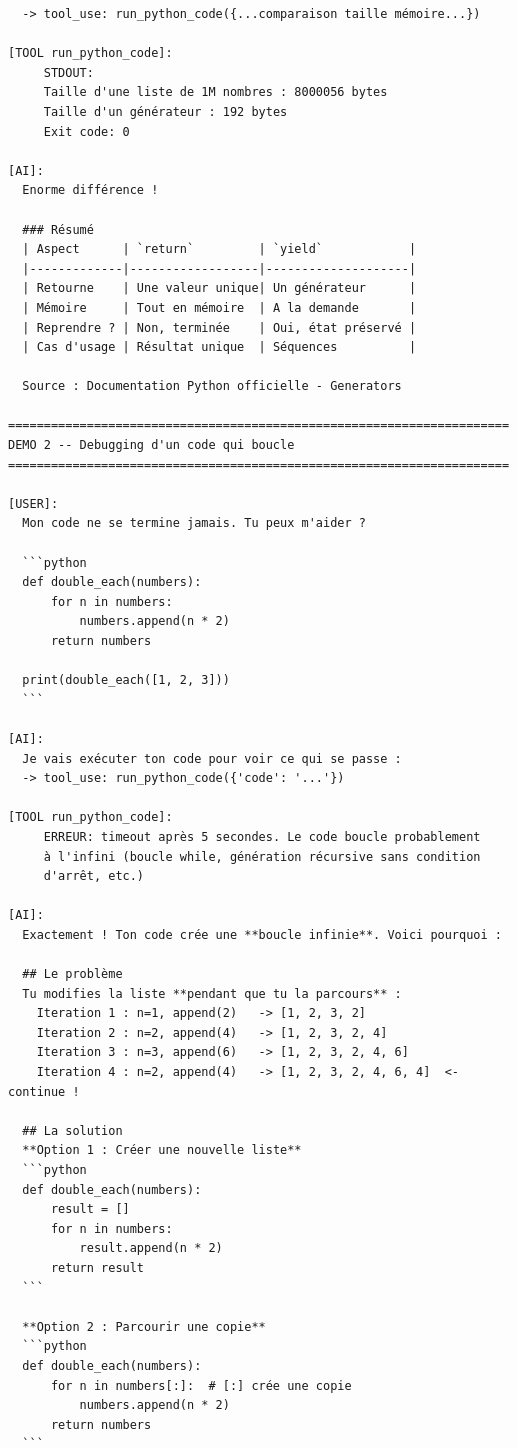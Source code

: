 \documentclass[11pt,a4paper]{article}
\begin{document}
\begin{tcolorbox}[
  colback=white,
  colframe=black!50,
  coltitle=black,
  fonttitle=\footnotesize\bfseries,
  fontupper=\footnotesize,
  title=Sortie de l'exécution,
  breakable,
]
\begin{verbatim}
  -> tool_use: run_python_code({...comparaison taille mémoire...})

[TOOL run_python_code]:
     STDOUT:
     Taille d'une liste de 1M nombres : 8000056 bytes
     Taille d'un générateur : 192 bytes
     Exit code: 0

[AI]:
  Enorme différence !

  ### Résumé
  | Aspect      | `return`         | `yield`            |
  |-------------|------------------|--------------------|
  | Retourne    | Une valeur unique| Un générateur      |
  | Mémoire     | Tout en mémoire  | A la demande       |
  | Reprendre ? | Non, terminée    | Oui, état préservé |
  | Cas d'usage | Résultat unique  | Séquences          |

  Source : Documentation Python officielle - Generators

======================================================================
DEMO 2 -- Debugging d'un code qui boucle
======================================================================

[USER]:
  Mon code ne se termine jamais. Tu peux m'aider ?

  ```python
  def double_each(numbers):
      for n in numbers:
          numbers.append(n * 2)
      return numbers

  print(double_each([1, 2, 3]))
  ```

[AI]:
  Je vais exécuter ton code pour voir ce qui se passe :
  -> tool_use: run_python_code({'code': '...'})

[TOOL run_python_code]:
     ERREUR: timeout après 5 secondes. Le code boucle probablement
     à l'infini (boucle while, génération récursive sans condition
     d'arrêt, etc.)

[AI]:
  Exactement ! Ton code crée une **boucle infinie**. Voici pourquoi :

  ## Le problème
  Tu modifies la liste **pendant que tu la parcours** :
    Iteration 1 : n=1, append(2)   -> [1, 2, 3, 2]
    Iteration 2 : n=2, append(4)   -> [1, 2, 3, 2, 4]
    Iteration 3 : n=3, append(6)   -> [1, 2, 3, 2, 4, 6]
    Iteration 4 : n=2, append(4)   -> [1, 2, 3, 2, 4, 6, 4]  <- continue !

  ## La solution
  **Option 1 : Créer une nouvelle liste**
  ```python
  def double_each(numbers):
      result = []
      for n in numbers:
          result.append(n * 2)
      return result
  ```

  **Option 2 : Parcourir une copie**
  ```python
  def double_each(numbers):
      for n in numbers[:]:  # [:] crée une copie
          numbers.append(n * 2)
      return numbers
  ```


\end{verbatim}
\end{tcolorbox}
\end{document}
